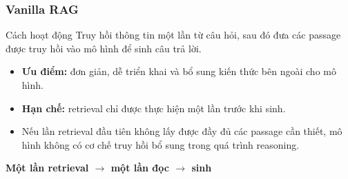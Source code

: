 
\begin{frame}
    \frametitle{Vanilla RAG}

    \begin{block}{Cách hoạt động}
        Truy hồi thông tin một lần từ câu hỏi, sau đó đưa các
        passage được truy hồi vào mô hình để sinh câu trả lời.
    \end{block}

    \vspace{0.25cm}

    \begin{center}
    \end{center}

    \vspace{0.25cm}

    \begin{itemize}
        \item \textbf{Ưu điểm:}
        đơn giản, dễ triển khai và bổ sung kiến thức bên ngoài
        cho mô hình.

        \item \textbf{Hạn chế:}
        retrieval chỉ được thực hiện một lần trước khi sinh.

        \item Nếu lần retrieval đầu tiên không lấy được đầy đủ các
        passage cần thiết, mô hình không có cơ chế truy hồi bổ sung
        trong quá trình reasoning.
    \end{itemize}

    \vspace{0.05cm}

    \begin{center}
        \textbf{Một lần retrieval $\rightarrow$ một lần đọc $\rightarrow$ sinh}
    \end{center}

\end{frame}


